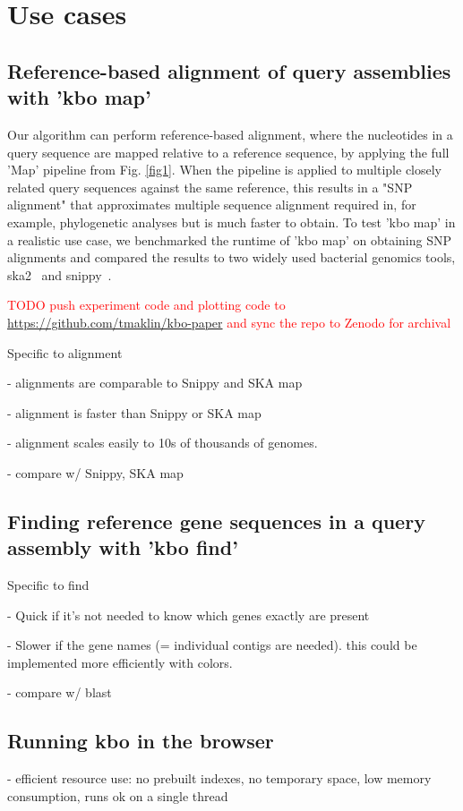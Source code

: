\documentclass[unnumsec,webpdf,contemporary,large]{oup-authoring-template}%
\theoremstyle{thmstyleone}%
\theoremstyle{thmstyletwo}%
\theoremstyle{thmstylethree}%
\begin{document}
\section{Use cases}

\subsection{Reference-based alignment of query assemblies with 'kbo map'}

Our algorithm can perform reference-based alignment, where the nucleotides in a query sequence are mapped relative to a reference sequence, by applying the full 'Map' pipeline from Fig. \ref{fig1}. When the pipeline is applied to multiple closely related query sequences against the same reference, this results in a "SNP alignment" that approximates multiple sequence alignment required in, for example, phylogenetic analyses but is much faster to obtain. To test 'kbo map' in a realistic use case, we benchmarked the runtime of 'kbo map' on obtaining SNP alignments and compared the results to two widely used bacterial genomics tools, ska2~\cite{derelle2024seamless, harris2018SKA} and snippy~\cite{seemann2015snippy}.



\textcolor{red}{TODO push experiment code and plotting code to \url{https://github.com/tmaklin/kbo-paper} and sync the repo to Zenodo for archival}

Specific to alignment

- alignments are comparable to Snippy and SKA map

- alignment is faster than Snippy or SKA map

- alignment scales easily to 10s of thousands of genomes.

- compare w/ Snippy, SKA map

\subsection{Finding reference gene sequences in a query assembly with 'kbo find'}

Specific to  find

- Quick if it's not needed to know which genes exactly are present

- Slower if the gene names (= individual contigs are needed). this could be implemented more efficiently with colors.

- compare w/ blast

\subsection{Running kbo in the browser}
- efficient resource use: no prebuilt indexes, no temporary space, low memory consumption, runs ok on a single thread
\end{document}
